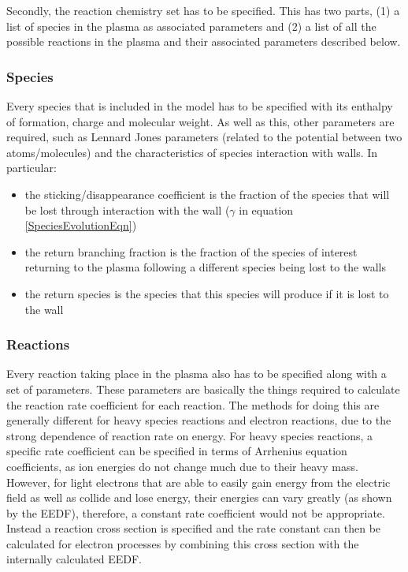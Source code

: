 \documentclass[11pt, oneside]{article}   	%
\begin{document}
Secondly, the reaction chemistry set has to be specified. 
This has two parts, (1) a list of species in the plasma as associated parameters and (2) a list of all the possible reactions in the plasma and their associated parameters described below.

\subsubsection{Species}
Every species that is included in the model has to be specified with its enthalpy of formation, charge and molecular weight.
As well as this, other parameters are required, such as Lennard Jones parameters (related to the potential between two atoms/molecules) and the characteristics of species interaction with walls.
In particular:
\begin{itemize}
\item the sticking/disappearance coefficient is the fraction of the species that will be lost through interaction with the wall ($\gamma$ in equation \ref{SpeciesEvolutionEqn})
\item the return branching fraction is the fraction of the species of interest returning to the plasma following a different species being lost to the walls
\item the return species is the species that this species will produce if it is lost to the wall
\end{itemize}


\subsubsection{Reactions}
Every reaction taking place in the plasma also has to be specified along with a set of parameters.
These parameters are basically the things required to calculate the reaction rate coefficient for each reaction.
The methods for doing this are generally different for heavy species reactions and electron reactions, due to the strong dependence of reaction rate on energy.
For heavy species reactions, a specific rate coefficient can be specified in terms of Arrhenius equation coefficients, as ion energies do not change much due to their heavy mass.
However, for light electrons that are able to easily gain energy from the electric field as well as collide and lose energy, their energies can vary greatly (as shown by the EEDF), therefore, a constant rate coefficient would not be appropriate. 
Instead a reaction cross section is specified and the rate constant can then be calculated for electron processes by combining this cross section with the internally calculated EEDF.
\end{document}
